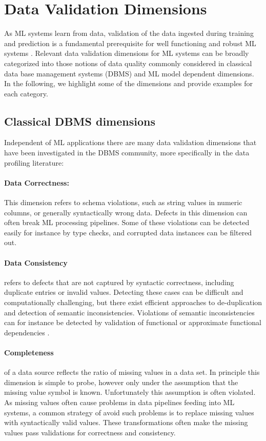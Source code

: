 \section{Data Validation Dimensions}
\label{sec:dimensions}

As ML systems learn from data, validation of the data ingested during training and prediction is a fundamental prerequisite for well functioning and robust ML systems \cite{Sculley2015, Bose2017a}. Relevant data validation dimensions for ML systems can be broadly categorized into those notions of data quality commonly considered in classical data base management systems (DBMS) and ML model dependent dimensions. In the following, we highlight some of the dimensions and provide examples for each category.

\subsection{Classical DBMS dimensions}

Independent of ML applications there are many data validation dimensions that have been investigated in the DBMS community, more specifically in the data profiling literature\cite{Abedjan2018}:

\paragraph{Data Correctness:} This dimension refers to schema violations, such as string values in numeric columns, or generally syntactically wrong data. Defects in this dimension can often break ML processing pipelines. Some of these violations can be detected easily for instance by type checks, and corrupted data instances can be filtered out.


\paragraph{Data Consistency} refers to defects that are not captured by syntactic correctness, including duplicate entries or invalid values. Detecting these cases can be difficult and computationally challenging, but there exist efficient approaches to de-duplication and detection of semantic inconsistencies. Violations of semantic inconsistencies can for instance be detected by validation of functional or approximate functional dependencies \cite{Papenbrock2015, Kruse2018}.

\paragraph{Completeness} of a data source reflects the ratio of missing values in a data set. In principle this dimension is simple to probe, however only under the assumption that the missing value symbol is known. Unfortunately this assumption is often violated. As missing values often cause problems in data pipelines feeding into ML systems, a common strategy of avoid such problems is to replace missing values with syntactically valid values. These transformations often make the missing values pass validations for correctness and consistency.

